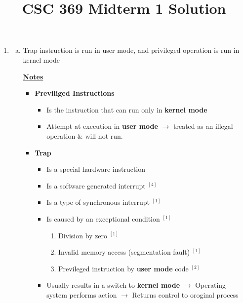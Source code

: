 \documentclass[12pt]{article}
\begin{document}
\title{CSC 369 Midterm 1 Solution}

\bigskip

\begin{enumerate}[1.]
    \item

    \begin{enumerate}[a)]
        \item Trap instruction is run in user mode, and privileged operation is
        run in kernel mode
        \bigskip

        \underline{\textbf{Notes}}

        \begin{itemize}
            \item \textbf{Previliged Instructions}

            \begin{itemize}
                \item Is the instruction that can run only in \textbf{kernel mode}
                \item Attempt at execution in \textbf{user mode} $\to$ treated as an illegal operation \& will not run.
            \end{itemize}

            \item \textbf{Trap}

            \begin{itemize}
                \item Is a special hardware instruction
                \item Is a software generated interrupt $^{[4]}$
                \item Is a type of synchronous interrupt $^{[1]}$
                \item Is caused by an exceptional condition $^{[1]}$

                \begin{enumerate}[1.]
                    \item Division by zero $^{[1]}$
                    \item Invalid memory access (segmentation fault) $^{[1]}$
                    \item Previleged instruction by \textbf{user mode} code $^{[2]}$
                \end{enumerate}
                \item Usually results in a switch to \textbf{kernel mode} $\to$ Operating system performs action $\to$
                Returns control to oroginal process
            \end{itemize}


\end{itemize}
\end{enumerate}
\end{enumerate}
\end{document}
